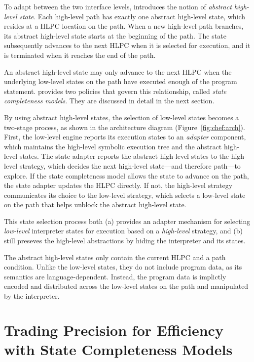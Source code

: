 To adapt between the two interface levels, \chef introduces the notion of \emph{abstract high-level state}.
%
Each high-level path has exactly one abstract high-level state, which resides at a HLPC location on the path.
%
When a new high-level path branches, its abstract high-level state starts at the beginning of the path.
%
The state subsequently advances to the next HLPC when it is selected for execution, and it is terminated when it reaches the end of the path.


An abstract high-level state may only advance to the next HLPC when the underlying low-level states on the path have executed enough of the program statement.
%
\chef provides two policies that govern this relationship, called \emph{state completeness models}.  They are discussed in detail in the next section.


By using abstract high-level states, the selection of low-level states becomes a two-stage process, as shown in the architecture diagram (Figure~\ref{fig:chef:arch}).
%
First, the low-level engine reports its execution states to an \emph{adapter} component, which maintains the high-level symbolic execution tree and the abstract high-level states.
%
The state adapter reports the abstract high-level states to the high-level strategy, which decides the next high-level state---and therefore path---to explore.
%
If the state completeness model allows the state to advance on the path, the state adapter updates the HLPC directly.
%
If not, the high-level strategy communicates its choice to the low-level strategy, which selects a low-level state on the path that helps unblock the abstract high-level state.


This state selection process both (a) provides an adapter mechanism for selecting \emph{low-level} interpreter states for execution based on a \emph{high-level} strategy, and (b) still preseves the high-level abstractions by hiding the interpreter and its states.


The abstract high-level states only contain the current HLPC and a path condition.
%
Unlike the low-level states, they do not include program data, as its semantics are language-dependent.
%
Instead, the program data is implictly encoded and distributed across the low-level states on the path and manipulated by the interpreter.


\section{Trading Precision for Efficiency with State Completeness Models}
\label{sec:chef:completeness-models}

